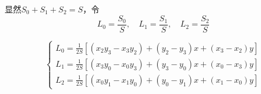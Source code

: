 \documentclass[a4paper,UTF8,titlepage]{ctexart}
\begin{document}
\begin{figure}[h]
	\centering
	\caption{}
	\label{xxy}
\end{figure}

显然$S_0 + S_1 + S_2 = S$，令
$$
L_0 = \frac{S_0}{S}, \quad L_1 = \frac{S_1}{S}, \quad L_2 = \frac{S_2}{S}
$$
\par

$$
\begin{cases}
	L_0 = \frac{1}{2S} [(x_2 y_3 - x_3 y_2) + (y_2 - y_3) x + (x_3 - x_2) y] \\
	L_1 = \frac{1}{2S} [(x_3 y_0 - x_0 y_3) + (y_3 - y_0) x + (x_0 - x_3) y] \\
	L_2 = \frac{1}{2S} [(x_0 y_1 - x_1 y_0) + (y_0 - y_1) x + (x_1 - x_0) y]
\end{cases} 
$$
\end{document}

